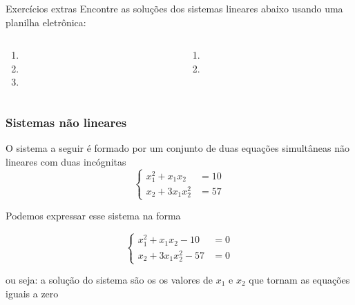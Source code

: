 \begin{frame}{Exercícios extras}
    Encontre as soluções dos sistemas lineares abaixo usando uma planilha eletrônica:

    \begin{columns}
        \begin{column}{0.45\textwidth}
            \begin{enumerate}
                \item {}
                \item {}
                \item {}
            \end{enumerate}
        \end{column}

        \begin{column}{0.45\textwidth}
            \begin{enumerate}\addtocounter{enumi}{3}
                \item {}
                \item {}
            \end{enumerate}
        \end{column}
    \end{columns}

\end{frame}

\begin{frame}
    \frametitle{Sistemas não lineares}

    O sistema a seguir é formado por um conjunto de duas equações simultâneas não lineares com duas incógnitas
    \[
        \begin{cases}
            x_1^2 + x_1x_2 &= 10 \\
            x_2 + 3x_1x_2^2 &= 57
        \end{cases}
    \]

    Podemos expressar esse sistema na forma

    \[
        \begin{cases}
            x_1^2 + x_1x_2 -10 &= 0 \\
            x_2 + 3x_1x_2^2 -57 &= 0
        \end{cases}
    \]

    ou seja: a solução do sistema são os os valores de $x_1$ e $x_2$ que tornam as equações iguais a zero
\end{frame}

